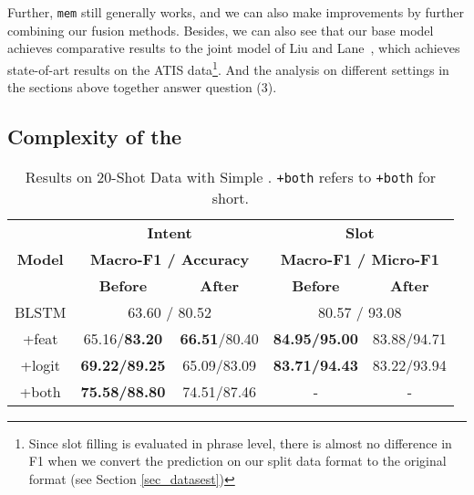 Further, \texttt{mem} still generally works, and we can also make improvements by further combining our fusion methods.
Besides, we can also see that our base model achieves comparative results to the joint model of  Liu and Lane~, which achieves state-of-art results on the ATIS data\footnote{
Since slot filling is evaluated in phrase level, there is almost no difference in F1 when we convert the prediction on our split data format to the original format (see Section \ref{sec_datasest})}.
And the analysis on different settings in the sections above together answer question (3).

\subsection{Complexity of the \RE}
\label{sec_complexity}
\begin{table}
\setlength{\tabcolsep}{0.23em}
\centering
\small{
\begin{tabular}{|c|c|c|c|c|}

\hline
\multirow{3}{*}{\textbf{Model}}  & \multicolumn{2}{|c|}{\textbf{Intent}} & \multicolumn{2}{|c|}{\textbf{Slot}}  \\
\cline{2-5}
  & \multicolumn{2}{|c|}{\textbf{Macro-F1 / Accuracy}} & \multicolumn{2}{|c|}{\textbf{Macro-F1 / Micro-F1}}  \\
\cline{2-5}
  & \textbf{Before} & \textbf{After} & \textbf{Before} & \textbf{After} \\
\hline
\rowcolor{Gray} BLSTM & \multicolumn{2}{|c|}{63.60 / 80.52} & \multicolumn{2}{|c|}{80.57 / 93.08}  \\
\hline
+feat & 65.16/\textbf{83.20} & \textbf{66.51}/80.40 & \textbf{84.95/95.00} & 83.88/94.71 \\
\hline
\rowcolor{Gray} +logit & \textbf{69.22/89.25} & 65.09/83.09 & \textbf{83.71/94.43} & 83.22/93.94  \\
\hline
+both & \textbf{75.58/88.80} & 74.51/87.46 & - & - \\
\hline
\end{tabular}
}
\caption{Results on 20-Shot Data with Simple \REs. \texttt{+both} refers to \ptatt\texttt{+both} for short.}
\label{tab_simple}
\end{table}

